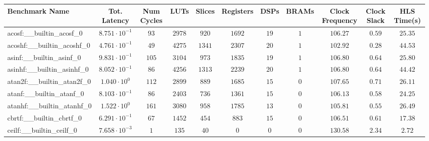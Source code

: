 \begin{tabular}{|l|c|c|c|c|c|c|c|c|c|c|}
\hline
Benchmark Name                            & Tot. Latency            & Num Cycles & LUTs      & Slices    & Registers & DSPs    & BRAMs & Clock Frequency & Clock Slack & HLS Time(s) \\
\hline
acosf:\_\_builtin\_acosf\_0               & $ 8.751 \cdot 10^{-1} $ & $ 93     $ & $ 2978  $ & $ 920   $ & $ 1692  $ & $ 19  $ & $ 1 $ & $ 106.27      $ & $ 0.59    $ & $ 25.35   $ \\
acoshf:\_\_builtin\_acoshf\_0             & $ 4.761 \cdot 10^{-1} $ & $ 49     $ & $ 4275  $ & $ 1341  $ & $ 2307  $ & $ 20  $ & $ 1 $ & $ 102.92      $ & $ 0.28    $ & $ 44.53   $ \\
asinf:\_\_builtin\_asinf\_0               & $ 9.831 \cdot 10^{-1} $ & $ 105    $ & $ 3104  $ & $ 973   $ & $ 1835  $ & $ 19  $ & $ 1 $ & $ 106.80      $ & $ 0.64    $ & $ 25.80   $ \\
asinhf:\_\_builtin\_asinhf\_0             & $ 8.052 \cdot 10^{-1} $ & $ 86     $ & $ 4256  $ & $ 1313  $ & $ 2239  $ & $ 20  $ & $ 1 $ & $ 106.80      $ & $ 0.64    $ & $ 44.42   $ \\
atan2f:\_\_builtin\_atan2f\_0             & $ 1.040 \cdot 10^{0}  $ & $ 112    $ & $ 2899  $ & $ 889   $ & $ 1685  $ & $ 15  $ & $ 0 $ & $ 107.65      $ & $ 0.71    $ & $ 26.11   $ \\
atanf:\_\_builtin\_atanf\_0               & $ 8.103 \cdot 10^{-1} $ & $ 86     $ & $ 2403  $ & $ 736   $ & $ 1361  $ & $ 15  $ & $ 0 $ & $ 106.13      $ & $ 0.58    $ & $ 24.25   $ \\
atanhf:\_\_builtin\_atanhf\_0             & $ 1.522 \cdot 10^{0}  $ & $ 161    $ & $ 3080  $ & $ 958   $ & $ 1785  $ & $ 13  $ & $ 0 $ & $ 105.81      $ & $ 0.55    $ & $ 26.49   $ \\
cbrtf:\_\_builtin\_cbrtf\_0               & $ 6.291 \cdot 10^{-1} $ & $ 67     $ & $ 1452  $ & $ 454   $ & $ 883   $ & $ 15  $ & $ 0 $ & $ 106.51      $ & $ 0.61    $ & $ 17.38   $ \\
ceilf:\_\_builtin\_ceilf\_0               & $ 7.658 \cdot 10^{-3} $ & $ 1      $ & $ 135   $ & $ 40    $ & $ 0     $ & $ 0   $ & $ 0 $ & $ 130.58      $ & $ 2.34    $ & $ 2.72    $ \\

\end{tabular}
